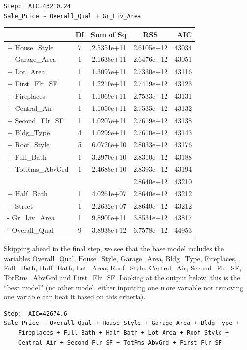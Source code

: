 \documentclass[
  letterpaper,
  DIV=11,
  numbers=noendperiod]{scrreprt}
\begin{document}
\begin{verbatim}
Step:  AIC=43210.24
Sale_Price ~ Overall_Qual + Gr_Liv_Area
\end{verbatim}

\begin{longtable}[]{@{}lcrcr@{}}
\toprule()
& Df & Sum of Sq & RSS & AIC \\
\midrule()
\endhead
+ House\_Style & 7 & 2.5351e+11 & 2.6105e+12 & 43034 \\
+ Garage\_Area & 1 & 2.1638e+11 & 2.6476e+12 & 43051 \\
+ Lot\_Area & 1 & 1.3097e+11 & 2.7330e+12 & 43116 \\
+ First\_Flr\_SF & 1 & 1.2210e+11 & 2.7419e+12 & 43123 \\
+ Fireplaces & 1 & 1.1069e+11 & 2.7533e+12 & 43131 \\
+ Central\_Air & 1 & 1.1050e+11 & 2.7535e+12 & 43132 \\
+ Second\_Flr\_SF & 1 & 1.0207e+11 & 2.7619e+12 & 43138 \\
+ Bldg\_Type & 4 & 1.0299e+11 & 2.7610e+12 & 43143 \\
+ Roof\_Style & 5 & 6.0726e+10 & 2.8033e+12 & 43176 \\
+ Full\_Bath & 1 & 3.2970e+10 & 2.8310e+12 & 43188 \\
+ TotRms\_AbvGrd & 1 & 2.4688e+10 & 2.8393e+12 & 43194 \\
& & & 2.8640e+12 & 43210 \\
+ Half\_Bath & 1 & 4.0261e+07 & 2.8640e+12 & 43212 \\
+ Street & 1 & 2.2632e+07 & 2.8640e+12 & 43212 \\
- Gr\_Liv\_Area & 1 & 9.8905e+11 & 3.8531e+12 & 43817 \\
- Overall\_Qual & 9 & 3.8938e+12 & 6.7578e+12 & 44953 \\
\bottomrule()
\end{longtable}

Skipping ahead to the final step, we see that the base model includes
the variables Overall\_Qual, House\_Style, Garage\_Area, Bldg\_Type,
Fireplaces, Full\_Bath, Half\_Bath, Lot\_Area, Roof\_Style,
Central\_Air, Second\_Flr\_SF, TotRms\_AbvGrd and First\_Flr\_SF.
Looking at the output below, this is the ``best model'' (no other model,
either inputting one more variable nor removing one variable can beat it
based on this criteria).

\begin{verbatim}
Step:  AIC=42674.6
Sale_Price ~ Overall_Qual + House_Style + Garage_Area + Bldg_Type + 
    Fireplaces + Full_Bath + Half_Bath + Lot_Area + Roof_Style + 
    Central_Air + Second_Flr_SF + TotRms_AbvGrd + First_Flr_SF
\end{verbatim}
\end{document}

